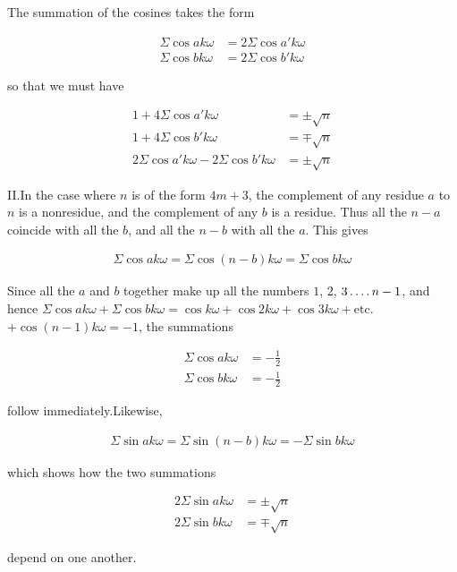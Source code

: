 The summation of the cosines takes the form

\[
\begin{aligned}
\Sigma\cos ak\omega&=2\Sigma\cos a'k\omega\\
\Sigma\cos bk\omega&=2\Sigma\cos b'k\omega
\end{aligned}
\]

so that we must have

\[
\begin{aligned}
1+4\Sigma\cos a'k\omega&=\pm\surd n\\
1+4\Sigma\cos b'k\omega&=\mp\surd n\\
2\Sigma\cos a'k\omega-2\Sigma\cos b'k\omega&=\pm\surd n
\end{aligned}
\]

II.\quad In the case where $n$ is of the form $4m+3$, the complement of any residue $a$ to $n$ is a nonresidue, and the complement of any $b$ is a residue. Thus all the $n-a$ coincide with all the $b$, and all the $n-b$ with all the $a$. This gives

\[
\begin{aligned}
\Sigma\cos ak\omega=\Sigma\cos(n-b)k\omega=\Sigma\cos bk\omega
\end{aligned}
\]

Since all the $a$ and $b$ together make up all the numbers $1$, $2$, $3\mathinner{.\,.\,.\,.} n-1$, and hence $\Sigma\cos ak\omega+\Sigma\cos bk\omega=\cos k\omega+\cos2k\omega+\cos3k\omega+\text{etc.}$ $+\cos(n-1)k\omega=-1$, the summations

\[
\begin{aligned}
\Sigma\cos ak\omega&=-\tfrac12\\
\Sigma\cos bk\omega&=-\tfrac12
\end{aligned}
\]

follow immediately.\quad Likewise,

\[
\begin{aligned}
\Sigma\sin ak\omega=\Sigma\sin(n-b)k\omega=-\Sigma\sin bk\omega
\end{aligned}
\]

which shows how the two summations

\[
\begin{aligned}
2\Sigma\sin ak\omega&=\pm\surd n\\
2\Sigma\sin bk\omega&=\mp\surd n
\end{aligned}
\]

depend on one another.


